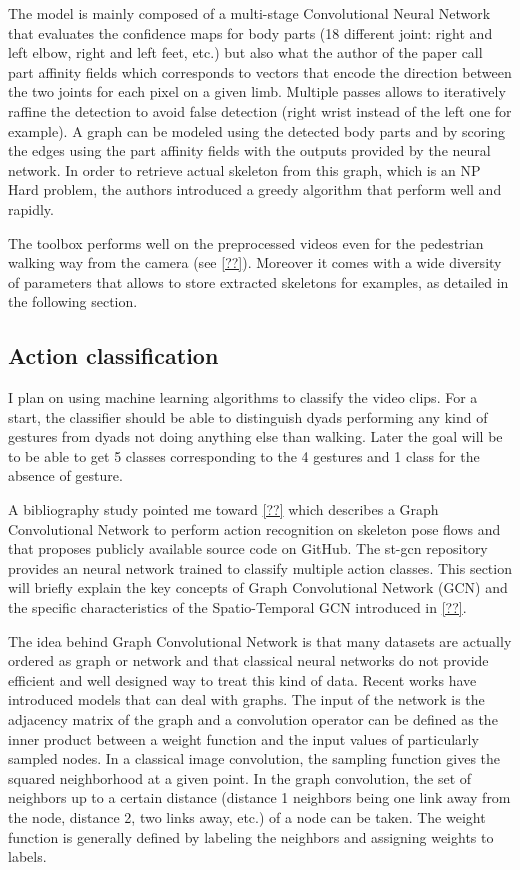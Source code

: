 \documentclass[12pt,a4paper,twoside]{article}
\begin{document}
The model is mainly composed of a multi-stage Convolutional Neural Network that evaluates the confidence maps for body parts (18 different joint: right and left elbow, right and left feet, etc.) but also what the author of the paper call \guillemotleft part affinity fields \guillemotright which corresponds to vectors that encode the direction between the two joints for each pixel on a given limb. Multiple passes allows to iteratively raffine the detection to avoid false detection (right wrist instead of the left one for example). A graph can be modeled using the detected body parts and by scoring the edges using the part affinity fields with the outputs provided by the neural network. In order to retrieve actual skeleton from this graph, which is an NP Hard problem, the authors  introduced a greedy algorithm that perform well and rapidly. 

The toolbox performs well on the preprocessed videos even for the pedestrian walking way from the camera (see \ref{??}). Moreover it comes with a wide diversity of parameters that allows to store extracted skeletons for examples, as detailed in the following section.

\subsection{Action classification}
I plan on using machine learning algorithms to classify the video clips. For a start, the classifier should be able to distinguish dyads performing any kind of gestures from dyads not doing anything else than walking. Later the goal will be to be able to get 5 classes corresponding to the 4 gestures and 1 class for the absence of gesture.

A bibliography study pointed me toward \ref{??} which describes a Graph Convolutional Network to perform action recognition on skeleton pose flows and that proposes publicly available source code on GitHub. The st-gcn repository provides an neural network trained to classify multiple action classes. This section will briefly explain the key concepts of Graph Convolutional Network (GCN) and the specific characteristics of the Spatio-Temporal GCN introduced in \ref{??}.

The idea behind Graph Convolutional Network is that many datasets are actually ordered as graph or network and that classical neural networks do not provide efficient and well designed way to treat this kind of data. Recent works have introduced models that can deal with graphs. The input of the network is the adjacency matrix of the graph and a convolution operator can be defined as the inner product between a weight function and the input values of particularly sampled nodes. In a classical image convolution, the sampling function gives the squared neighborhood at a given point. In the graph convolution, the set of neighbors up to a certain distance (distance 1 neighbors being one link away from the node, distance 2, two links away, etc.) of a node can be taken. The weight function is generally defined by labeling the neighbors and assigning weights to labels. 
 
\end{document}
